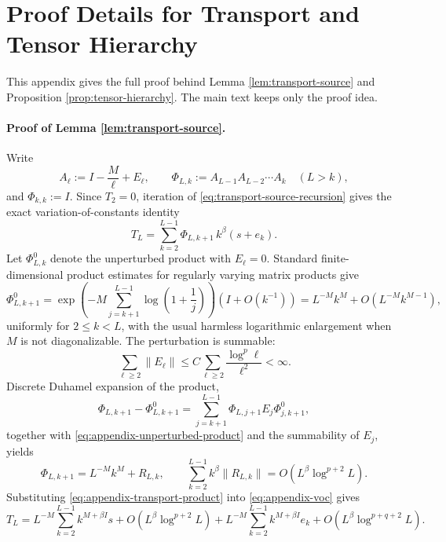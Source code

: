\documentclass{article}
\begin{document}
\FloatBarrier
\appendix
\renewcommand{\theHfigure}{appendix.\arabic{figure}}
\renewcommand{\theHtable}{appendix.\arabic{table}}

\section{Proof Details for Transport and Tensor Hierarchy}
\label{app:transport-hierarchy-proof}
This appendix gives the full proof behind Lemma \ref{lem:transport-source} and Proposition \ref{prop:tensor-hierarchy}. The main text keeps only the proof idea.

\paragraph{Proof of Lemma \ref{lem:transport-source}.}
Write
\[
A_\ell:=I-\frac{M}{\ell}+E_\ell,
\qquad
\Phi_{L,k}:=A_{L-1}A_{L-2}\cdots A_k
\quad (L>k),
\]
and \(\Phi_{k,k}:=I\). Since \(T_2=0\), iteration of \eqref{eq:transport-source-recursion} gives the exact variation-of-constants identity
\begin{equation}
T_L
=
\sum_{k=2}^{L-1}\Phi_{L,k+1}\,k^\beta(s+e_k).
\label{eq:appendix-voc}
\end{equation}
Let \(\Phi^0_{L,k}\) denote the unperturbed product with \(E_\ell=0\). Standard finite-dimensional product estimates for regularly varying matrix products give
\begin{equation}
\Phi^0_{L,k+1}
=
\exp\!\left(-M\sum_{j=k+1}^{L-1}\log\left(1+\frac1j\right)\right)
\left(I+O(k^{-1})\right)
=
L^{-M}k^{M}+O\!\left(L^{-M}k^{M-1}\right),
\label{eq:appendix-unperturbed-product}
\end{equation}
uniformly for \(2\le k<L\), with the usual harmless logarithmic enlargement when \(M\) is not diagonalizable. The perturbation is summable:
\[
\sum_{\ell\ge2}\|E_\ell\|
\le
C\sum_{\ell\ge2}\frac{\log^p\ell}{\ell^2}
<\infty.
\]
Discrete Duhamel expansion of the product,
\[
\Phi_{L,k+1}-\Phi^0_{L,k+1}
=
\sum_{j=k+1}^{L-1}
\Phi_{L,j+1}E_j\Phi^0_{j,k+1},
\]
together with \eqref{eq:appendix-unperturbed-product} and the summability of \(E_j\), yields
\begin{equation}
\Phi_{L,k+1}
=
L^{-M}k^M+R_{L,k},
\qquad
\sum_{k=2}^{L-1} k^\beta\|R_{L,k}\|
=
O\!\left(L^\beta\log^{p+2}L\right).
\label{eq:appendix-transport-product}
\end{equation}
Substituting \eqref{eq:appendix-transport-product} into \eqref{eq:appendix-voc} gives
\begin{equation}
T_L
=
L^{-M}\sum_{k=2}^{L-1}k^{M+\beta I}s
+O\!\left(L^\beta\log^{p+2}L\right)
+L^{-M}\sum_{k=2}^{L-1}k^{M+\beta I}e_k
+O\!\left(L^\beta\log^{p+q+2}L\right).
\label{eq:appendix-transport-sum}
\end{equation}
\end{document}
